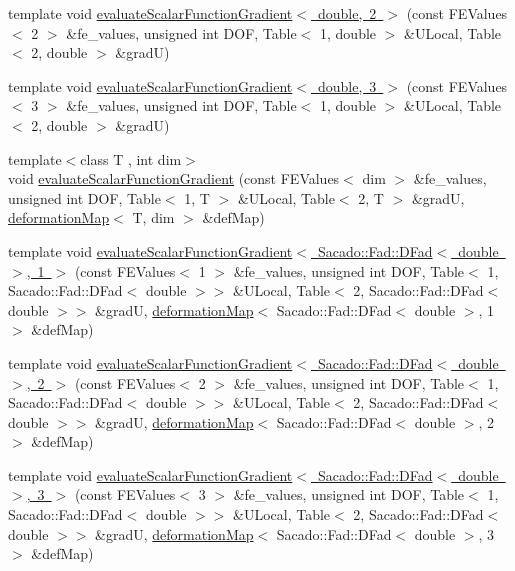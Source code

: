\begin{DoxyCompactItemize}
\item 
template void \mbox{\hyperlink{function_evaluations_8cc_aebfcd53aa3d6ed1aade3f0a3b404e790}{evaluate\+Scalar\+Function\+Gradient$<$ double, 2 $>$}} (const F\+E\+Values$<$ 2 $>$ \&fe\+\_\+values, unsigned int D\+OF, Table$<$ 1, double $>$ \&U\+Local, Table$<$ 2, double $>$ \&gradU)
\item 
template void \mbox{\hyperlink{function_evaluations_8cc_a9c4d97c0a964edc8d705a9086abc7a87}{evaluate\+Scalar\+Function\+Gradient$<$ double, 3 $>$}} (const F\+E\+Values$<$ 3 $>$ \&fe\+\_\+values, unsigned int D\+OF, Table$<$ 1, double $>$ \&U\+Local, Table$<$ 2, double $>$ \&gradU)
\item 
{\footnotesize template$<$class T , int dim$>$ }\\void \mbox{\hyperlink{group___evaluation_functions_gabeb71201e8213a7c7616cd8824617f73}{evaluate\+Scalar\+Function\+Gradient}} (const F\+E\+Values$<$ dim $>$ \&fe\+\_\+values, unsigned int D\+OF, Table$<$ 1, T $>$ \&U\+Local, Table$<$ 2, T $>$ \&gradU, \mbox{\hyperlink{structdeformation_map}{deformation\+Map}}$<$ T, dim $>$ \&def\+Map)
\item 
template void \mbox{\hyperlink{function_evaluations_8cc_a7a07a439fec6ad8cbb76757b9e0832ce}{evaluate\+Scalar\+Function\+Gradient$<$ Sacado\+::\+Fad\+::\+D\+Fad$<$ double $>$, 1 $>$}} (const F\+E\+Values$<$ 1 $>$ \&fe\+\_\+values, unsigned int D\+OF, Table$<$ 1, Sacado\+::\+Fad\+::\+D\+Fad$<$ double $>$$>$ \&U\+Local, Table$<$ 2, Sacado\+::\+Fad\+::\+D\+Fad$<$ double $>$$>$ \&gradU, \mbox{\hyperlink{structdeformation_map}{deformation\+Map}}$<$ Sacado\+::\+Fad\+::\+D\+Fad$<$ double $>$, 1 $>$ \&def\+Map)
\item 
template void \mbox{\hyperlink{function_evaluations_8cc_a9314f95484440c9c86bff06911c6d52e}{evaluate\+Scalar\+Function\+Gradient$<$ Sacado\+::\+Fad\+::\+D\+Fad$<$ double $>$, 2 $>$}} (const F\+E\+Values$<$ 2 $>$ \&fe\+\_\+values, unsigned int D\+OF, Table$<$ 1, Sacado\+::\+Fad\+::\+D\+Fad$<$ double $>$$>$ \&U\+Local, Table$<$ 2, Sacado\+::\+Fad\+::\+D\+Fad$<$ double $>$$>$ \&gradU, \mbox{\hyperlink{structdeformation_map}{deformation\+Map}}$<$ Sacado\+::\+Fad\+::\+D\+Fad$<$ double $>$, 2 $>$ \&def\+Map)
\item 
template void \mbox{\hyperlink{function_evaluations_8cc_aa5c93137a9a61bb5f455809ac3862e34}{evaluate\+Scalar\+Function\+Gradient$<$ Sacado\+::\+Fad\+::\+D\+Fad$<$ double $>$, 3 $>$}} (const F\+E\+Values$<$ 3 $>$ \&fe\+\_\+values, unsigned int D\+OF, Table$<$ 1, Sacado\+::\+Fad\+::\+D\+Fad$<$ double $>$$>$ \&U\+Local, Table$<$ 2, Sacado\+::\+Fad\+::\+D\+Fad$<$ double $>$$>$ \&gradU, \mbox{\hyperlink{structdeformation_map}{deformation\+Map}}$<$ Sacado\+::\+Fad\+::\+D\+Fad$<$ double $>$, 3 $>$ \&def\+Map)

\end{DoxyCompactItemize}
